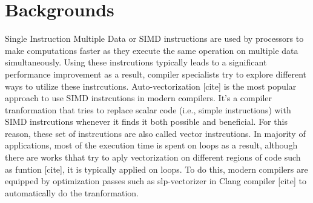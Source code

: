 \documentclass[\main/thesis.tex]{subfiles}
\begin{document}
\chapter{Backgrounds}

Single Instruction Multiple Data or SIMD instructions are used by processors to make computations faster as they execute the same operation on multiple data simultaneously. Using these instrcutions typically leads to a significant performance improvement as a result, compiler specialists try to explore different ways to utilize these instrcutions. Auto-vectorization [cite] is the most popular approach to use SIMD instrcutions in modern compilers. It's a compiler tranformation that tries to replace scalar code  (i.e., simple instructions) with SIMD instrcutions whenever it finds it both possible and beneficial. For this reason, these set of instrcutions are also called vector instrcutions.
In majority of applications, most of the execution time is spent on loops as a result, although there are works thhat try to aply vectorization on different regions of code such as funtion [cite], it is typically applied on loops. To do this, modern compilers are equipped by optimization passes such as slp-vectorizer in Clang compiler [cite] to automatically do the tranformation.

\end{document}
